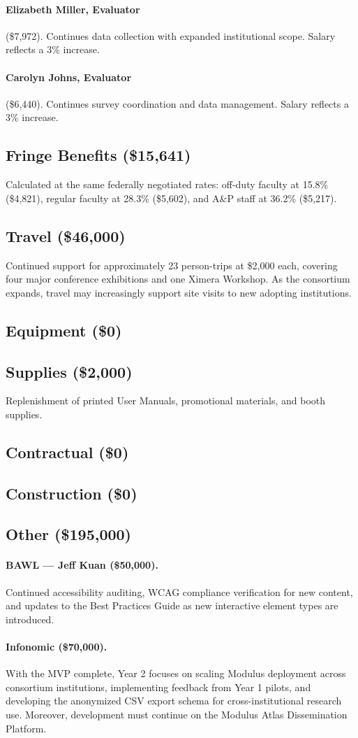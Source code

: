 \documentclass[12pt,letterpaper]{article}
\newcommand{\budgetcat}[1]{\subsection*{#1}}
\begin{document}
\paragraph{Elizabeth Miller, Evaluator} (\$7,972). Continues data collection with expanded institutional scope. Salary reflects a 3\% increase.

\paragraph{Carolyn Johns, Evaluator} (\$6,440). Continues survey coordination and data management. Salary reflects a 3\% increase.

\budgetcat{Fringe Benefits (\$15,641)}

Calculated at the same federally negotiated rates: off-duty faculty at 15.8\% (\$4,821), regular faculty at 28.3\% (\$5,602), and A\&P staff at 36.2\% (\$5,217).

\budgetcat{Travel (\$46,000)}

Continued support for approximately 23 person-trips at \$2,000 each, covering four major conference exhibitions and one Ximera Workshop. As the consortium expands, travel may increasingly support site visits to new adopting institutions.

\budgetcat{Equipment (\$0)}

\budgetcat{Supplies (\$2,000)}

Replenishment of printed User Manuals, promotional materials, and booth supplies.

\budgetcat{Contractual (\$0)}

\budgetcat{Construction (\$0)}

\budgetcat{Other (\$195,000)}

\paragraph{BAWL --- Jeff Kuan (\$50,000).} Continued accessibility auditing, WCAG compliance verification for new content, and updates to the Best Practices Guide as new interactive element types are introduced.

\paragraph{Infonomic (\$70,000).} With the MVP complete, Year 2 focuses on scaling Modulus deployment across consortium institutions, implementing feedback from Year 1 pilots, and developing the anonymized CSV export schema for cross-institutional research use. Moreover, development must continue on the Modulus Atlas Dissemination Platform. 
\end{document}
